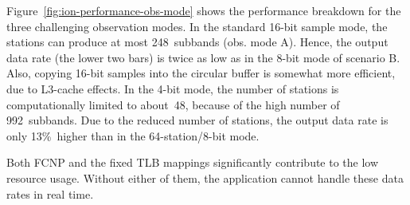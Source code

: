 \documentclass[10pt]{article}
\begin{document}
Figure~\ref{fig:ion-performance-obs-mode} shows the performance breakdown
for the three challenging observation modes.
In the standard 16-bit sample mode, the stations can produce at most
248~subbands (obs. mode A).
Hence, the output data rate (the lower two bars) is twice as low as in the
8-bit mode of scenario B.
Also, copying 16-bit samples into the circular buffer is somewhat more
efficient, due to L3-cache effects.
In the 4-bit mode, the number of stations is computationally limited to
about~48, because of the high number of 992~subbands.
Due to the reduced number of stations, the output data rate is only 13\%~higher
than in the 64-station/8-bit mode.



Both FCNP and the fixed TLB mappings significantly contribute to the low
resource usage.
Without either of them, the application cannot handle these data rates in
real time.
\end{document}
